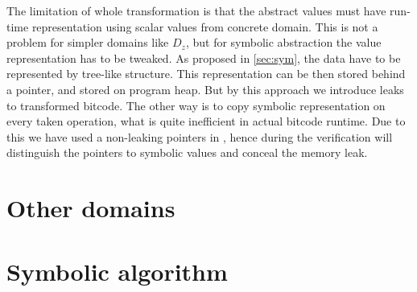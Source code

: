 The limitation of whole transformation is that the abstract values must have
run-time representation using scalar values from concrete domain. This is not a
problem for simpler domains like $D_z$, but for symbolic abstraction the value
representation has to be tweaked. As proposed in \autoref{sec:sym}, the data
have to be represented by tree-like structure. This representation can be then
stored behind a pointer, and stored on program heap. But by this approach we
introduce leaks to transformed bitcode. The other way is to copy symbolic
representation on every taken operation, what is quite inefficient in actual
bitcode runtime. Due to this we have used a non-leaking pointers in \DIVINE,
hence during the verification \DIVINE will distinguish the pointers to symbolic
values and conceal the memory leak.

\section{ Other domains }

\section{ Symbolic algorithm } \label{sec:symbolic}

